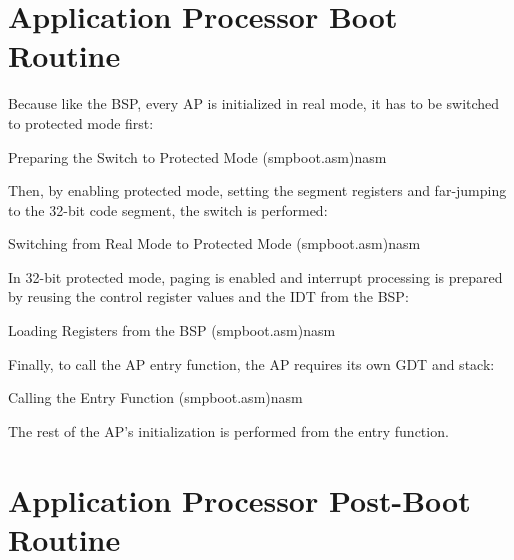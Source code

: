 
\section{Application Processor Boot Routine}
\label{sec:apxapboot}

Because like the BSP, every AP is initialized in real mode, it has to be switched to protected mode
first:

\begin{codeblock}{Preparing the Switch to Protected Mode (smp\textunderscore{}boot.asm)}{nasm}
\end{codeblock}

Then, by enabling protected mode, setting the segment registers and far-jumping to the 32-bit code
segment, the switch is performed:

\begin{codeblock}{Switching from Real Mode to Protected Mode (smp\textunderscore{}boot.asm)}{nasm}
\end{codeblock}

In 32-bit protected mode, paging is enabled and interrupt processing is prepared by reusing the
control register values and the IDT from the BSP:

\begin{codeblock}{Loading Registers from the BSP (smp\textunderscore{}boot.asm)}{nasm}
\end{codeblock}

Finally, to call the AP entry function, the AP requires its own GDT and stack:

\begin{codeblock}{Calling the Entry Function (smp\textunderscore{}boot.asm)}{nasm}
\end{codeblock}

The rest of the AP's initialization is performed from the entry function.


\section{Application Processor Post-Boot Routine}
\label{sec:apxappostboot}

